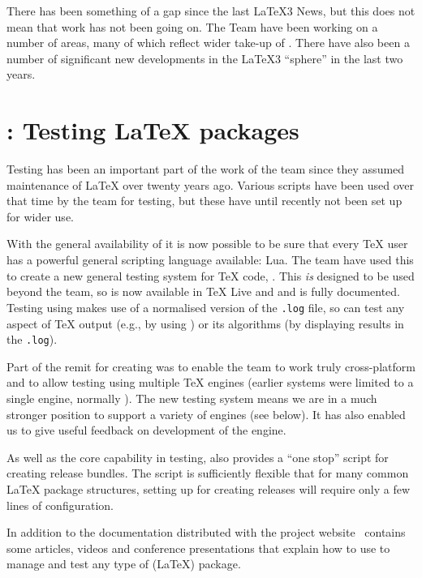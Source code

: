 \documentclass{ltnews}
\begin{document}
\maketitle

There has been something of a gap since the last \LaTeX3 News, but this does
not mean that work has not been going on. The Team have been working on a
number of areas, many of which reflect wider take-up of . There have
also been a number of significant new developments in the \LaTeX3
\enquote{sphere} in the last two years.

\section{: Testing \LaTeX{} packages}

Testing has been an important part of the work of the team since they assumed
maintenance of \LaTeX{} over twenty years ago. Various scripts have been used
over that time by the team for testing, but these have until recently not been
set up for wider use.

With the general availability of  it is now possible to be sure
that every \TeX{} user has a powerful general scripting language available:
Lua. The team have used this to create a new general testing system for \TeX{}
code, . This \emph{is} designed to be used beyond the team, so is
now available in \TeX{} Live and  and is fully documented.
Testing using  makes use of a normalised version of the
\texttt{.log} file, so can test any aspect of \TeX{} output (e.g., by using
) or its algorithms (by displaying results in the \texttt{.log}).

Part of the remit for creating  was to enable the team to work
truly cross-platform and to allow testing using multiple \TeX{} engines
(earlier systems were limited to a single engine, normally \eTeX{}). The new
testing system means we are in a much stronger position to support a variety of
engines (see below). It has also enabled us to give useful feedback on
development of the  engine.

As well as the core capability in testing,  also provides a
\enquote{one stop} script for creating release bundles. The script is
sufficiently flexible that for many common \LaTeX{} package structures, setting
up for creating releases will require only a few lines of configuration.

In addition to the documentation distributed with  the project
website~\cite[publications in 2014]{project-publications} contains some
articles, videos and conference presentations that explain how to use
 to manage and test any type of (\LaTeX{}) package.
\end{document}
